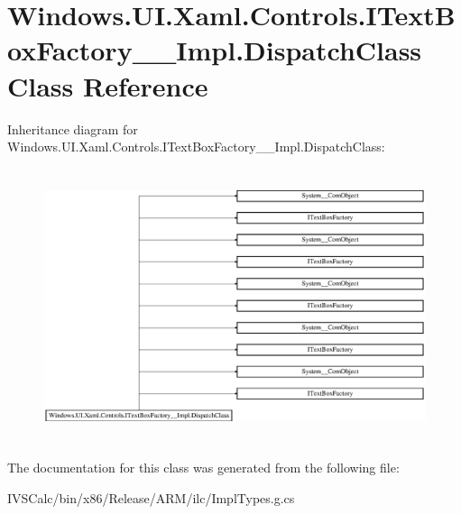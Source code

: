 \hypertarget{class_windows_1_1_u_i_1_1_xaml_1_1_controls_1_1_i_text_box_factory_____impl_1_1_dispatch_class}{}\section{Windows.\+U\+I.\+Xaml.\+Controls.\+I\+Text\+Box\+Factory\+\_\+\+\_\+\+Impl.\+Dispatch\+Class Class Reference}
\label{class_windows_1_1_u_i_1_1_xaml_1_1_controls_1_1_i_text_box_factory_____impl_1_1_dispatch_class}
Inheritance diagram for Windows.\+U\+I.\+Xaml.\+Controls.\+I\+Text\+Box\+Factory\+\_\+\+\_\+\+Impl.\+Dispatch\+Class\+:\begin{figure}[H]
\begin{center}
\leavevmode
\includegraphics[height=8.041776cm]{class_windows_1_1_u_i_1_1_xaml_1_1_controls_1_1_i_text_box_factory_____impl_1_1_dispatch_class}
\end{center}
\end{figure}


The documentation for this class was generated from the following file\+:\begin{DoxyCompactItemize}
\item 
I\+V\+S\+Calc/bin/x86/\+Release/\+A\+R\+M/ilc/Impl\+Types.\+g.\+cs\end{DoxyCompactItemize}
